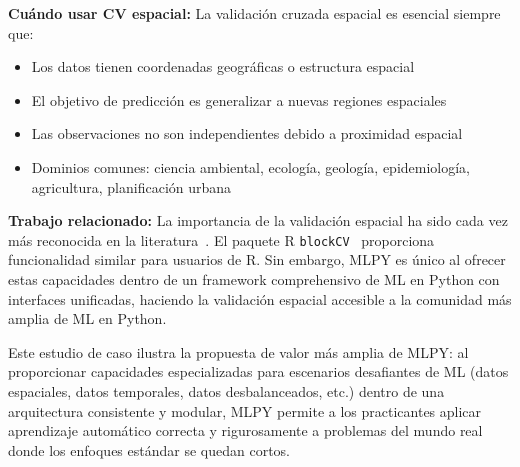 \textbf{Cuándo usar CV espacial:} La validación cruzada espacial es esencial siempre que:
\begin{itemize}
\item Los datos tienen coordenadas geográficas o estructura espacial
\item El objetivo de predicción es generalizar a nuevas regiones espaciales
\item Las observaciones no son independientes debido a proximidad espacial
\item Dominios comunes: ciencia ambiental, ecología, geología, epidemiología, agricultura, planificación urbana
\end{itemize}

\textbf{Trabajo relacionado:} La importancia de la validación espacial ha sido cada vez más reconocida en la literatura~\citep{roberts2017cross, meyer2018improving, ploton2020spatial}. El paquete R \texttt{blockCV}~\citep{valavi2019blockcv} proporciona funcionalidad similar para usuarios de R. Sin embargo, MLPY es único al ofrecer estas capacidades dentro de un framework comprehensivo de ML en Python con interfaces unificadas, haciendo la validación espacial accesible a la comunidad más amplia de ML en Python.

Este estudio de caso ilustra la propuesta de valor más amplia de MLPY: al proporcionar capacidades especializadas para escenarios desafiantes de ML (datos espaciales, datos temporales, datos desbalanceados, etc.) dentro de una arquitectura consistente y modular, MLPY permite a los practicantes aplicar aprendizaje automático correcta y rigurosamente a problemas del mundo real donde los enfoques estándar se quedan cortos.
